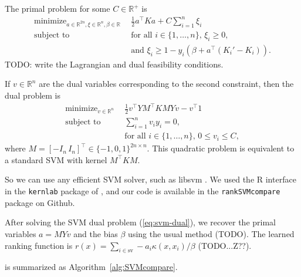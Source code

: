 \documentclass{article}
\newcommand{\RR}{\mathbb R}
\DeclareMathOperator*{\minimize}{minimize}
\begin{document}

The primal problem for some $C\in\RR^+$ is
\begin{equation}
  \begin{aligned}
      \minimize_{a\in\RR^{2n},\xi\in\RR^n,\beta\in\RR}\ \ & 
      \frac 1 2 a^\intercal K a + C\sum_{i=1}^n \xi_i \\
      \text{subject to}\ \ & 
      \text{for all $i\in\{1,\dots,n\}$, }
      \xi_i \geq 0,\\
      &\text{and }
      \xi_i \geq 1-y_i(\beta + a^\intercal (K_i'-K_i)).
  \end{aligned}
\end{equation}
TODO: write the Lagrangian and dual feasibility conditions.

If $v\in\RR^n$ are the dual variables corresponding to the second
constraint, then the dual problem is
\begin{equation}
  \begin{aligned}
    \label{eq:svm-dual}
    \minimize_{v\in\RR^n}\ \ &
    \frac 1 2 v^\intercal Y M^\intercal K M Y v - v^\intercal 1\\
    \text{subject to}\ \ &
    \sum_{i=1}^n v_i y_i = 0,\\
&    \text{for all $i\in\{1,\dots,n\}$, } 0\leq v_i\leq C,
  \end{aligned}
\end{equation}
where $M=[-I_n \, I_n]^\intercal\in\{-1,0,1\}^{2n\times n}$. This quadratic problem
is equivalent to a standard SVM with kernel $M^\intercal K M$.

So we can use any efficient SVM solver, such as libsvm
\citep{libsvm}. We used the R interface in the \texttt{kernlab}
package of \citet{kernlab}, and our code is available in the
\texttt{rankSVMcompare} package on Github.

After solving the SVM dual problem (\ref{eq:svm-dual}), we recover the
primal variables $a = MYv$ and the bias $\beta$ using the usual method
(TODO). The learned ranking function is $r(x) = \sum_{i\in\text{sv}}
-a_i \kappa(x, x_i)/\beta$ (TODO...Z??).

 is summarized as Algorithm~\ref{alg:SVMcompare}.
\end{document}
